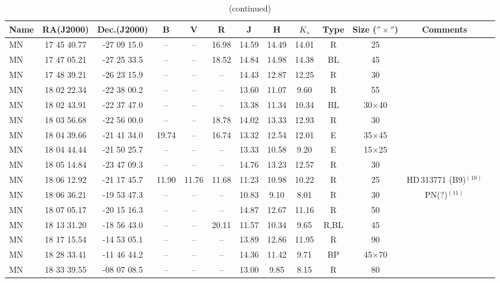 \documentclass[useAMS]{mn2e}
\newcounter{qub}
\newcommand{\qq}{\addtocounter{qub}{1}\arabic{qub}}
\begin{document}
%
\addtocounter{table}{-1}
%
\begin{table*}
\caption{(continued)} \label{catalog} \centering
\renewcommand{\footnoterule}{}  %
\begin{tabular}{lcccccccccccc}
\hline
Name &  RA(J2000) & Dec.(J2000) & B & V & R & J & H & $K_s$ & Type & Size ($''\times ''$) & Comments \\
\hline
MN\qq & 17 45 40.77 & -27 09 15.0 & -- & -- & 16.98 & 14.59 & 14.49 & 14.01 & R & 25 &  \\
MN\qq & 17 47 05.21 & -27 25 33.5 & -- & -- & 18.52 & 14.84 & 14.98 & 14.38 & BL & 45 &  \\
MN\qq & 17 48 39.21 & -26 23 15.9 & -- & -- & -- & 14.43 & 12.87 & 12.25 & R & 30 &  \\
MN\qq & 18 02 22.34 & -22 38 00.2 & -- & -- & -- & 13.60 & 11.07 & 9.60 & R & 55 &  \\
MN\qq & 18 02 43.91 & -22 37 47.0 & -- & -- & -- & 13.38 & 11.34 & 10.34 & BL & 30$\times$40 &  \\
MN\qq & 18 03 56.68 & -22 56 00.0 & -- & -- & 18.78 & 14.02 & 13.33 & 12.93 & R & 30 &  \\
MN\qq & 18 04 39.66 & -21 41 34.0 & 19.74 & -- & 16.74 & 13.32 & 12.54 & 12.01 & E & 35$\times$45 &  \\
MN\qq & 18 04 44.44 & -21 50 25.7 & -- & -- & -- & 13.33 & 10.58 & 9.20 & E & 15$\times$25 &  \\
MN\qq & 18 05 14.84 & -23 47 09.3 & -- & -- & -- & 14.76 & 13.23 & 12.57 & R & 30 &  \\
MN\qq & 18 06 12.92 & -21 17 45.7 & 11.90 & 11.76 & 11.68 & 11.23 & 10.98 & 10.22 & R & 25 & HD\,313771 (B9)$^{(10)}$ \\
MN\qq & 18 06 36.21 & -19 53 47.3 & -- & -- & -- & 10.83 & 9.10 & 8.01 & R & 30 & PN(?)$^{(11)}$ \\
MN\qq & 18 07 05.17 & -20 15 16.3 & -- & -- & -- & 14.87 & 12.67 & 11.16 & R & 50 &  \\
MN\qq & 18 13 31.20 & -18 56 43.0 & -- & -- & 20.11 & 11.57 & 10.34 & 9.65 & R,BL & 45 &  \\
MN\qq & 18 17 15.54 & -14 53 05.1 & -- & -- & -- & 13.89 & 12.86 & 11.95 & R & 90 &  \\
MN\qq & 18 28 33.41 & -11 46 44.2 & -- & -- & -- & 14.36 & 11.42 & 9.71 & BP & 45$\times$70 &  \\
MN\qq & 18 33 39.55 & -08 07 08.5 & -- & -- & -- & 13.00 & 9.85 & 8.15 & R & 80 &  \\

\end{tabular}
\end{table*}
\end{document}
